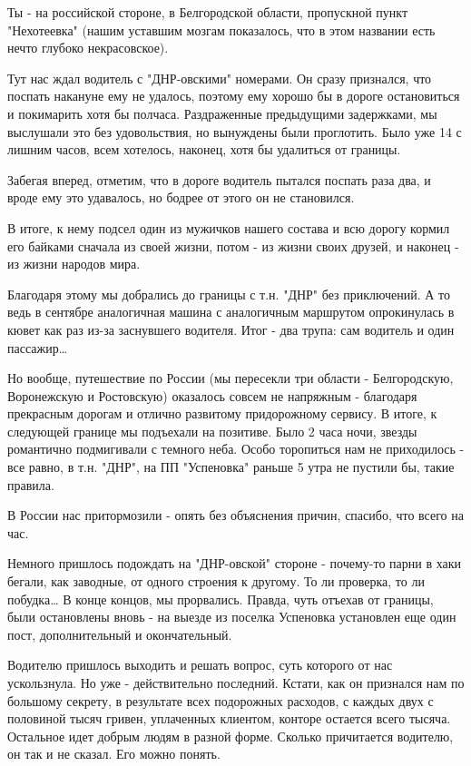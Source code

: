 Ты - на российской стороне, в Белгородской области, пропускной пункт
"Нехотеевка" (нашим уставшим мозгам показалось, что в этом названии есть нечто
глубоко некрасовское).

Тут нас ждал водитель с "ДНР-овскими" номерами. Он сразу признался, что поспать
накануне ему не удалось, поэтому ему хорошо бы в дороге остановиться и
покимарить хотя бы полчаса. Раздраженные предыдущими задержками, мы выслушали
это без удовольствия, но вынуждены были проглотить. Было уже 14 с лишним часов,
всем хотелось, наконец, хотя бы удалиться от границы.

Забегая вперед, отметим, что в дороге водитель пытался поспать раза два, и
вроде ему это удавалось, но бодрее от этого он не становился.

В итоге, к нему подсел один из мужичков нашего состава и всю дорогу кормил его
байками сначала из своей жизни, потом - из жизни своих друзей, и наконец - из
жизни народов мира.

Благодаря этому мы добрались до границы с т.н. "ДНР" без приключений. А то ведь
в сентябре аналогичная машина с аналогичным маршрутом опрокинулась в кювет как
раз из-за заснувшего водителя. Итог - два трупа: сам водитель и один пассажир…

Но вообще, путешествие по России (мы пересекли три области - Белгородскую,
Воронежскую и Ростовскую) оказалось совсем не напряжным - благодаря прекрасным
дорогам и отлично развитому придорожному сервису. В итоге, к следующей границе
мы подъехали на позитиве. Было 2 часа ночи, звезды романтично подмигивали с
темного неба. Особо торопиться нам не приходилось - все равно, в т.н. "ДНР", на
ПП "Успеновка" раньше 5 утра не пустили бы, такие правила.

В России нас притормозили - опять без объяснения причин, спасибо, что всего на
час.

Немного пришлось подождать на "ДНР-овской" стороне - почему-то парни в хаки
бегали, как заводные, от одного строения к другому. То ли проверка, то ли
побудка… В конце концов, мы прорвались. Правда, чуть отъехав от границы, были
остановлены вновь - на выезде из поселка Успеновка установлен еще один пост,
дополнительный и окончательный.

Водителю пришлось выходить и решать вопрос, суть которого от нас ускользнула.
Но уже - действительно последний. Кстати, как он признался нам по большому
секрету, в результате всех подорожных расходов, с каждых двух с половиной тысяч
гривен, уплаченных клиентом, конторе остается всего тысяча. Остальное идет
добрым людям в разной форме. Сколько причитается водителю, он так и не сказал.
Его можно понять.

